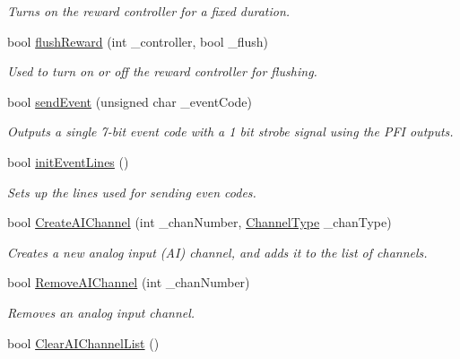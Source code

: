 \begin{DoxyCompactItemize}
\begin{DoxyCompactList}\small\item\em Turns on the reward controller for a fixed duration. \end{DoxyCompactList}\item 
bool \hyperlink{class_picto_1_1_picto_box_daq_board_af16170b7e96220374b1157cd6cca377a}{flush\-Reward} (int \-\_\-controller, bool \-\_\-flush)
\begin{DoxyCompactList}\small\item\em Used to turn on or off the reward controller for flushing. \end{DoxyCompactList}\item 
bool \hyperlink{class_picto_1_1_picto_box_daq_board_ab417044d19bde503e987c924a8a792b2}{send\-Event} (unsigned char \-\_\-event\-Code)
\begin{DoxyCompactList}\small\item\em Outputs a single 7-\/bit event code with a 1 bit strobe signal using the P\-F\-I outputs. \end{DoxyCompactList}\item 
bool \hyperlink{class_picto_1_1_picto_box_daq_board_a1efe7895802010f084d0bea0402275f1}{init\-Event\-Lines} ()
\begin{DoxyCompactList}\small\item\em Sets up the lines used for sending even codes. \end{DoxyCompactList}\item 
bool \hyperlink{class_picto_1_1_picto_box_daq_board_aaa800680e1de921932f06c91760ab372}{Create\-A\-I\-Channel} (int \-\_\-chan\-Number, \hyperlink{class_picto_1_1_picto_box_daq_board_a360f27f60651ecf404df481d9e214839}{Channel\-Type} \-\_\-chan\-Type)
\begin{DoxyCompactList}\small\item\em Creates a new analog input (A\-I) channel, and adds it to the list of channels. \end{DoxyCompactList}\item 
bool \hyperlink{class_picto_1_1_picto_box_daq_board_a399ad18e1d12c6b3e103eca7b547dcc3}{Remove\-A\-I\-Channel} (int \-\_\-chan\-Number)
\begin{DoxyCompactList}\small\item\em Removes an analog input channel. \end{DoxyCompactList}\item 
bool \hyperlink{class_picto_1_1_picto_box_daq_board_ac5f84bdfbcf9f3cfa70c4ec56a46b747}{Clear\-A\-I\-Channel\-List} ()

\end{DoxyCompactItemize}
